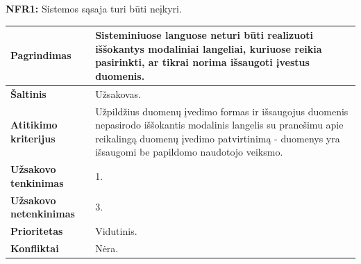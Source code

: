 \documentclass[12pt]{article}
\begin{document}
\noindent \textbf{NFR1:} Sistemos sąsaja turi būti neįkyri.
\label{sec:NFR1}
\begin{table}[htb!]
    \captionsetup{justification=centering}
    \begin{tabular}{|m{4.9cm}|m{11cm}|}
        \hline
        \raggedleft \textbf{\cellcolor{deepchampagne}Pagrindimas} &
        Sisteminiuose languose neturi būti realizuoti iššokantys modaliniai
        langeliai, kuriuose reikia pasirinkti, ar tikrai norima išsaugoti
        įvestus duomenis. \\
        \hline
        \raggedleft \textbf{\cellcolor{deepchampagne}Šaltinis} & Užsakovas. \\
        \hline
        \raggedleft \textbf{\cellcolor{deepchampagne}Atitikimo kriterijus} & 
        Užpildžius duomenų įvedimo formas ir išsaugojus duomenis nepasirodo
        iššokantis modalinis langelis su pranešimu apie reikalingą duomenų
        įvedimo patvirtinimą - duomenys yra išsaugomi be papildomo naudotojo
        veiksmo. \\
        \hline
        \raggedleft \textbf{\cellcolor{deepchampagne}Užsakovo tenkinimas} & 1. \\
        \hline
        \raggedleft \textbf{\cellcolor{deepchampagne}Užsakovo netenkinimas} & 3. \\
        \hline
        \raggedleft \textbf{\cellcolor{deepchampagne}Prioritetas} & Vidutinis. \\
        \hline
        \raggedleft \textbf{\cellcolor{deepchampagne}Konfliktai} & Nėra. \\
        \hline
    \end{tabular}
\end{table}
\end{document}
